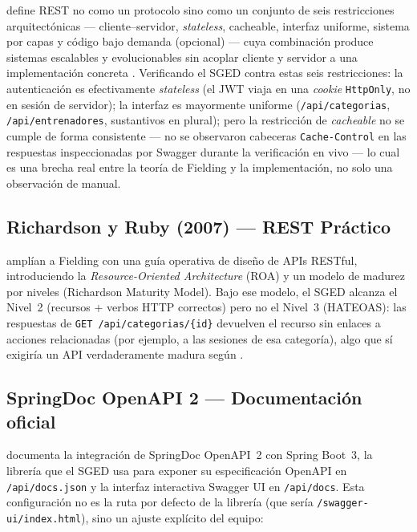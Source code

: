 \documentclass[12pt,a4paper]{article}
\begin{document}
\textcite{fielding2000} define REST no como un protocolo sino como un conjunto de seis
restricciones arquitectónicas --- cliente--servidor, \textit{stateless}, cacheable, interfaz
uniforme, sistema por capas y código bajo demanda (opcional) --- cuya combinación produce
sistemas escalables y evolucionables sin acoplar cliente y servidor a una implementación
concreta \parencite{fielding2000}. Verificando el SGED contra estas seis restricciones:
la autenticación es efectivamente \textit{stateless} (el JWT viaja en una \textit{cookie}
\texttt{HttpOnly}, no en sesión de servidor); la interfaz es mayormente uniforme
(\texttt{/api/categorias}, \texttt{/api/entrenadores}, sustantivos en plural); pero la
restricción de \textit{cacheable} no se cumple de forma consistente --- no se observaron
cabeceras \texttt{Cache-Control} en las respuestas inspeccionadas por Swagger durante la
verificación en vivo --- lo cual es una brecha real entre la teoría de Fielding y la
implementación, no solo una observación de manual.

\subsection{Richardson y Ruby (2007) --- REST Práctico}

\textcite{richardson2007} amplían a Fielding con una guía operativa de diseño de APIs
RESTful, introduciendo la \textit{Resource-Oriented Architecture} (ROA) y un modelo de
madurez por niveles (Richardson Maturity Model). Bajo ese modelo, el SGED alcanza el
Nivel~2 (recursos + verbos HTTP correctos) pero no el Nivel~3 (HATEOAS): las respuestas de
\texttt{GET /api/categorias/\{id\}} devuelven el recurso sin enlaces a acciones relacionadas
(por ejemplo, a las sesiones de esa categoría), algo que sí exigiría un API verdaderamente
madura según \textcite{richardson2007}.

\subsection{SpringDoc OpenAPI 2 --- Documentación oficial}

\textcite{springdoc2024} documenta la integración de SpringDoc OpenAPI~2 con Spring Boot~3,
la librería que el SGED usa para exponer su especificación OpenAPI en
\texttt{/api/docs.json} y la interfaz interactiva Swagger UI en \texttt{/api/docs}. Esta
configuración no es la ruta por defecto de la librería (que sería
\texttt{/swagger-ui/index.html}), sino un ajuste explícito del equipo:
\end{document}
